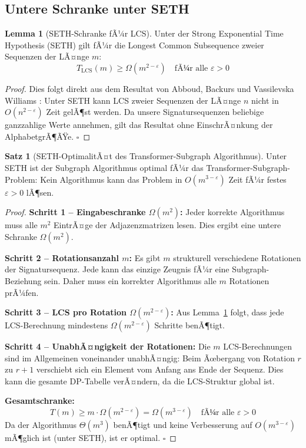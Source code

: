 ﻿\documentclass[a4paper,12pt]{article}
\theoremstyle{definition}
\newtheorem{satz}{Satz}
\newtheorem{lemma}{Lemma}
\begin{document}
\subsection{Untere Schranke unter SETH}

\begin{lemma}[SETH-Schranke fÃ¼r LCS]
\label{lem:seth}
	Unter der Strong Exponential Time Hypothesis (SETH) gilt fÃ¼r die
	Longest Common Subsequence zweier Sequenzen der LÃ¤nge $m$:
	\[
	T_{\mathrm{LCS}}(m) \geq \Omega(m^{2-\varepsilon}) \quad \text{fÃ¼r alle } \varepsilon > 0
	\]
\end{lemma}

\begin{proof}
	Dies folgt direkt aus dem Resultat von Abboud, Backurs und Vassilevska
	Williams \cite{abboud2015tight}: Unter SETH kann LCS zweier Sequenzen
	der LÃ¤nge $n$ nicht in $O(n^{2-\varepsilon})$ Zeit gelÃ¶st werden.
	Da unsere Signatursequenzen beliebige ganzzahlige Werte annehmen, gilt
	das Resultat ohne EinschrÃ¤nkung der AlphabetgrÃ¶ÃŸe. \qquad $\square$
\end{proof}

\begin{satz}[SETH-OptimalitÃ¤t des Transformer-Subgraph Algorithmus]
\label{satz:optimalitaet}
	Unter SETH ist der Subgraph Algorithmus optimal fÃ¼r das
	Transformer-Subgraph-Problem: Kein Algorithmus kann das Problem
	in $O(m^{3-\varepsilon})$ Zeit fÃ¼r festes $\varepsilon > 0$ lÃ¶sen.
\end{satz}

\begin{proof}
	\textbf{Schritt 1 -- Eingabeschranke $\Omega(m^2)$:}
	Jeder korrekte Algorithmus muss alle $m^2$ EintrÃ¤ge der Adjazenzmatrizen
	lesen. Dies ergibt eine untere Schranke $\Omega(m^2)$.

	\textbf{Schritt 2 -- Rotationsanzahl $m$:}
	Es gibt $m$ strukturell verschiedene Rotationen der Signatursequenz.
	Jede kann das einzige Zeugnis fÃ¼r eine Subgraph-Beziehung sein.
	Daher muss ein korrekter Algorithmus alle $m$ Rotationen prÃ¼fen.

	\textbf{Schritt 3 -- LCS pro Rotation $\Omega(m^{2-\varepsilon})$:}
	Aus Lemma~\ref{lem:seth} folgt, dass jede LCS-Berechnung mindestens
	$\Omega(m^{2-\varepsilon})$ Schritte benÃ¶tigt.

	\textbf{Schritt 4 -- UnabhÃ¤ngigkeit der Rotationen:}
	Die $m$ LCS-Berechnungen sind im Allgemeinen voneinander unabhÃ¤ngig:
	Beim Ãœbergang von Rotation $r$ zu $r+1$ verschiebt sich ein Element
	vom Anfang ans Ende der Sequenz. Dies kann die gesamte DP-Tabelle
	verÃ¤ndern, da die LCS-Struktur global ist.

	\textbf{Gesamtschranke:}
	\[
	T(m) \geq m \cdot \Omega(m^{2-\varepsilon}) = \Omega(m^{3-\varepsilon})
	\quad \text{fÃ¼r alle } \varepsilon > 0
	\]
	Da der Algorithmus $\Theta(m^3)$ benÃ¶tigt und keine Verbesserung auf
	$O(m^{3-\varepsilon})$ mÃ¶glich ist (unter SETH), ist er optimal. \qquad $\square$
\end{proof}
\end{document}
